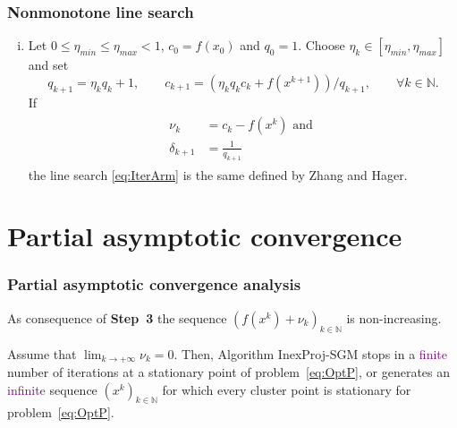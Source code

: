 \begin{frame}[t]\frametitle{Nonmonotone line search}
  \begin{block}{}
    \begin{enumerate}[(iii)]
      \item Let   $0\leq \eta_{min}\leq \eta_{max}<1$,   $c_0 = f(x_0)$ and  $q_0 = 1$. Choose $\eta_k\in [\eta_{min},  \eta_{max}]$ and set
            \begin{equation*}
              q_{k+1}=\eta_kq_{k}+1, \qquad c_{k+1} = (\eta_k q_k c_k + f(x^{k+1}))/q_{k+1}, \qquad \forall k \in \mathbb{N}.
            \end{equation*}
            If
            \begin{align}\label{eq:nuZH}
              \begin{aligned}
                \nu_{k}      & = c_k-f(x^k) \mbox{ and } \\
                \delta_{k+1} & = \frac{1}{q_{k+1}}
              \end{aligned}
            \end{align}
            the line search \eqref{eq:IterArm} is the same defined by Zhang and Hager.
    \end{enumerate}
  \end{block}
\end{frame}



\section{Partial asymptotic convergence}


\begin{frame}[t]\frametitle{Partial asymptotic convergence analysis}
  \begin{lemma}[3.2]
    As consequence of \textbf{Step~3} the sequence   $\left(f(x^k)+\nu_k\right)_{k\in\mathbb{N}}$ is    non-increasing.
  \end{lemma}

  \bigskip
  \bigskip
  \bigskip


  \begin{proposition}[3.3]
    Assume that $\displaystyle\lim_{k\to +\infty} \nu_{k} = 0$.   Then, Algorithm InexProj-SGM stops in a \textcolor{purple}{finite} number of iterations at a stationary point of problem~\eqref{eq:OptP}, or generates an \textcolor{purple}{infinite} sequence $(x^k)_{k\in\mathbb{N}}$ for which every cluster point is stationary for problem~\eqref{eq:OptP}.
  \end{proposition}
\end{frame}


